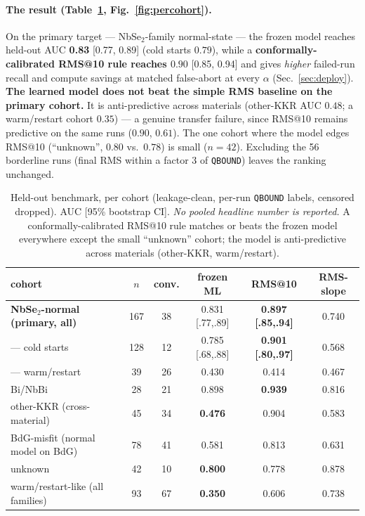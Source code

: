 \documentclass[11pt]{article}
\newcommand{\code}[1]{\texttt{#1}}
\begin{document}
\paragraph{The result (Table~\ref{tab:percohort}, Fig.~\ref{fig:percohort}).} On the primary target ---
NbSe$_2$-family normal-state --- the frozen model reaches held-out AUC \textbf{0.83} [0.77, 0.89] (cold
starts $0.79$), while a \textbf{conformally-calibrated RMS@10 rule reaches $0.90$} [0.85, 0.94] and gives
\emph{higher} failed-run recall and compute savings at matched false-abort at every $\alpha$
(Sec.~\ref{sec:deploy}). \textbf{The learned model does not beat the simple RMS baseline on the primary
cohort.} It is anti-predictive across materials (other-KKR AUC $0.48$; a warm/restart cohort $0.35$) ---
a genuine transfer failure, since RMS@10 remains predictive on the same runs ($0.90$, $0.61$). The one
cohort where the model edges RMS@10 (``unknown'', $0.80$ vs.\ $0.78$) is small ($n{=}42$). Excluding the
56 borderline runs (final RMS within a factor 3 of \code{QBOUND}) leaves the ranking unchanged.

\begin{table}[h]\centering
\caption{Held-out benchmark, per cohort (leakage-clean, per-run \code{QBOUND} labels, censored dropped).
AUC [95\% bootstrap CI]. \emph{No pooled headline number is reported.} A conformally-calibrated RMS@10
rule matches or beats the frozen model everywhere except the small ``unknown'' cohort; the model is
anti-predictive across materials (other-KKR, warm/restart).}
\label{tab:percohort}
\begin{tabular}{lccccc}
\toprule
cohort & $n$ & conv. & frozen ML & RMS@10 & RMS-slope \\
\midrule
\textbf{NbSe$_2$-normal (primary, all)} & 167 & 38 & 0.831 [.77,.89] & \textbf{0.897 [.85,.94]} & 0.740 \\
\quad --- cold starts & 128 & 12 & 0.785 [.68,.88] & \textbf{0.901 [.80,.97]} & 0.568 \\
\quad --- warm/restart & 39 & 26 & 0.430 & 0.414 & 0.467 \\
Bi/NbBi & 28 & 21 & 0.898 & \textbf{0.939} & 0.816 \\
other-KKR (cross-material) & 45 & 34 & \textbf{0.476} & 0.904 & 0.583 \\
BdG-misfit (normal model on BdG) & 78 & 41 & 0.581 & 0.813 & 0.631 \\
unknown & 42 & 10 & \textbf{0.800} & 0.778 & 0.878 \\
warm/restart-like (all families) & 93 & 67 & \textbf{0.350} & 0.606 & 0.738 \\
\bottomrule
\end{tabular}
\end{table}
\end{document}

